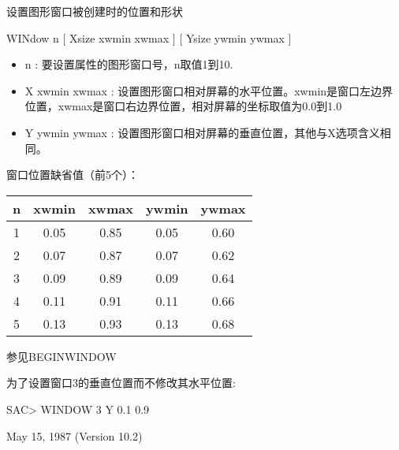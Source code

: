 \label{cmd:window}

设置图形窗口被创建时的位置和形状

WINdow n [ Xsize xwmin xwmax ]  [ Ysize ywmin ywmax ]

\begin{itemize}
\item n : 要设置属性的图形窗口号，n取值1到10. 
\item X xwmin xwmax : 设置图形窗口相对屏幕的水平位置。xwmin是窗口左边界位置，xwmax是窗口右边界位置，相对屏幕的坐标取值为0.0到1.0  
\item Y ywmin ywmax : 设置图形窗口相对屏幕的垂直位置，其他与X选项含义相同。
\end{itemize}

窗口位置缺省值（前5个）： 

\begin{tabular}{ccccc}
\toprule
 n & xwmin & xwmax & ywmin & ywmax  \\
\midrule
 1 & 0.05  & 0.85  & 0.05  & 0.60 \\
 2 & 0.07  & 0.87  & 0.07  & 0.62 \\
 3 & 0.09  & 0.89  & 0.09  & 0.64 \\
 4 & 0.11  & 0.91  & 0.11  & 0.66 \\
 5 & 0.13  & 0.93  & 0.13  & 0.68 \\
\bottomrule
\end{tabular}

参见BEGINWINDOW

为了设置窗口3的垂直位置而不修改其水平位置:
\begin{SACCode}
SAC> WINDOW 3 Y 0.1 0.9
\end{SACCode}

May 15, 1987 (Version 10.2)

